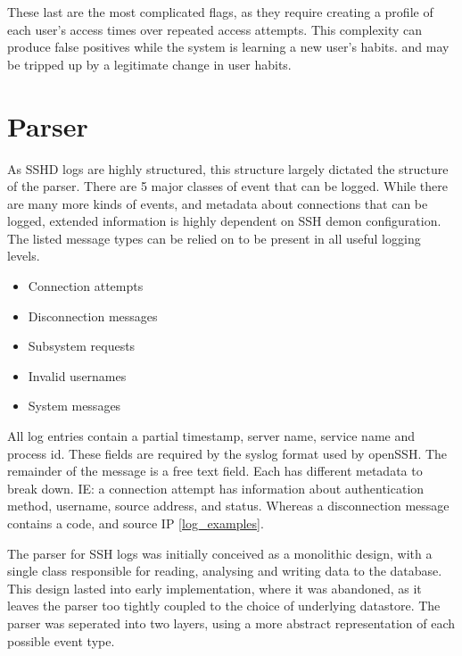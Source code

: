 These last are the most complicated flags, as they require creating a profile of each user's access times over repeated access attempts. This complexity can produce false positives while the system is learning a new user's habits. and may be tripped up by a legitimate change in user habits.

\section{Parser}\label{parser}

As SSHD logs are highly structured, this structure largely dictated the structure of the parser. There are 5 major classes of event that can be logged. While there are many more kinds of events, and metadata about connections that can be logged, extended information is highly dependent on SSH demon configuration. The listed message types can be relied on to be present in all useful logging levels. 
\begin{itemize}
\item{Connection attempts}
\item{Disconnection messages}
\item{Subsystem requests}
\item{Invalid usernames}
\item{System messages}
\end{itemize}

All log entries contain a partial timestamp, server name, service name and process id. These fields are required by the syslog format used by openSSH. The remainder of the message is a free text field. Each has different metadata to break down. IE:  a connection attempt has information about authentication method, username, source address, and status. Whereas a disconnection message contains a code, and source IP \ref{log_examples}.

The parser for SSH logs was initially conceived as a monolithic design, with a single class responsible for reading, analysing and writing data to the database. This design lasted into early implementation, where it was abandoned, as it leaves the parser too tightly coupled to the choice of underlying datastore. The parser was seperated into two layers, using a more abstract representation of each possible event type.

